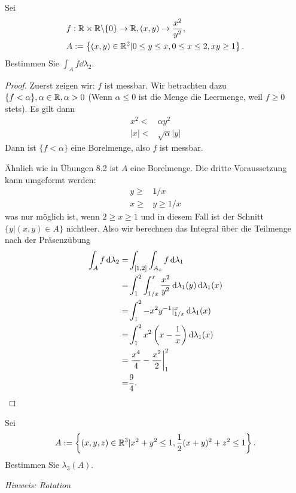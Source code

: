 \begin{Problem}
	Sei
	\begin{align*}
&		f:\mathbb{R}\times \mathbb{R}\backslash \{0\} \to \mathbb{R}, (x,y)\to \frac{x^2}{y^2},\\
&		A:=\left\{ (x,y)\in \mathbb{R}^2|0\le y\le x, 0\le x \le 2, xy\ge 1 \right\} .
	\end{align*}
	Bestimmen Sie $\int_A f\dd{\lambda_2}$.
\end{Problem}
\begin{proof}
	Zuerst zeigen wir: $f$ ist messbar. Wir betrachten dazu $\{f< \alpha\} ,\alpha\in \mathbb{R},\alpha >0$ (Wenn $\alpha\le 0$ ist die Menge die Leermenge, weil $f\ge 0$ stets). Es gilt dann
	\begin{align*}
		x^2<& \alpha y^2\\
		|x|<&\sqrt{\alpha}|y|
	\end{align*}
	Dann ist $\{f<\alpha\} $ eine Borelmenge, also $f$ ist messbar.

	Ähnlich wie in Übungen 8.2 ist $A$ eine Borelmenge. Die dritte Voraussetzung kann umgeformt werden:
	\begin{align*}
		y\ge& 1 / x\\
		x \ge& y \ge 1 / x
	\end{align*}
	was nur möglich ist, wenn $2\ge x\ge 1$ und in diesem Fall ist der Schnitt $\{y|(x,y)\in A\} $ nichtleer. Also wir berechnen das Integral über die Teilmenge nach der Präsenzübung
	\begin{align*}
		\int_A f\dd{\lambda_2}=&\int_{[1,2]}\int_{A_x} f\dd{\lambda_1}\\
		=&\int_1^2 \int_{1 / x}^x \frac{x^2}{y^2}\dd{\lambda_1(y)}\dd{\lambda_1(x)}\\
		=&\int_1^2 -x^2 y^{-1}|_{1 / x}^x\dd{\lambda_1(x)}\\
		=&\int_1^2 x^2\left( x-\frac{1}{x} \right) \dd{\lambda_1(x)}\\
		=& \left.\frac{x^4}{4}-\frac{x^2}{2}\right|_1^2\\
			=&\frac{9}{4}.\qedhere
	\end{align*}
\end{proof}
\begin{Problem}
	Sei
	\[
	A:=\left\{ (x,y,z)\in \mathbb{R}^3|x^2+y^2\le 1,\frac{1}{2}(x+y)^2+z^2\le 1 \right\} 
	.\] 
	Bestimmen Sie $\lambda_3(A)$.

	{\footnotesize \emph{Hinweis: Rotation}}
\end{Problem}
